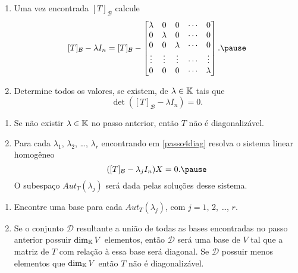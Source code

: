 \documentclass{beamer}
\begin{document}
    \begin{frame}
        \begin{enumerate}[label={\arabic*})]
            \conti
            \item Uma vez encontrada $[T]_\mathcal{B}$ calcule\pause
            \[
                [T]_\mathcal{B} - \lambda I_n = [T]_\mathcal{B} - \begin{bmatrix}\lambda & 0 & 0 & \cdots & 0\\0 & \lambda & 0 & \cdots & 0\\0 & 0 & \lambda & \cdots & 0\\\vdots & \vdots & \vdots & \cdots & \vdots\\0 & 0 & 0 & \cdots & \lambda\end{bmatrix}.\pause
            \]

            \item\label{passo4diag} Determine todos os valores, \pause se existem, de $\lambda \in \mathbb{K}$ \pause tais que\pause
            \[
                \det([T]_\mathcal{B} - \lambda I_n) = 0.
            \]
            \seti
        \end{enumerate}
    \end{frame}

    \begin{frame}
        \begin{enumerate}[label={\arabic*})]
            \conti
            \item Se não existir $\lambda \in \mathbb{K}$ \pause no passo anterior, \pause então $T$ não é diagonalizável.\pause

            \vspace*{1cm}

            \item Para cada $\lambda_1$, \pause $\lambda_2$, \pause \dots, $\lambda_r$ \pause encontrando em \ref{passo4diag} \pause resolva o sistema linear homogêneo\pause
            \[
                ([T]_\mathcal{B} - \lambda_jI_n)X = 0.\pause
            \]
            O subespaço $Aut_T(\lambda_j)$ \pause será dada pelas soluções desse sistema.
            \seti
        \end{enumerate}
    \end{frame}

    \begin{frame}
        \begin{enumerate}[label={\arabic*})]
        \conti
            \item Encontre uma base para cada $Aut_T(\lambda_j)$, \pause com $j = 1$, 2, \dots, $r$.\pause

            \vspace*{1cm}

            \item Se o conjunto $\mathcal{D}$ \pause resultante a união de todas as bases encontradas no passo anterior \pause possuir $\dim_{\mathbb{K}}V$ elementos, \pause então $\mathcal{D}$ será uma base de $V$ \pause tal que a matriz de $T$ com relação à essa base será diagonal. \pause Se $\mathcal{D}$ possuir menos elementos que $\dim_{\mathbb{K}}V$ \pause então $T$ não é diagonalizável.
        \end{enumerate}
    \end{frame}
\end{document}
